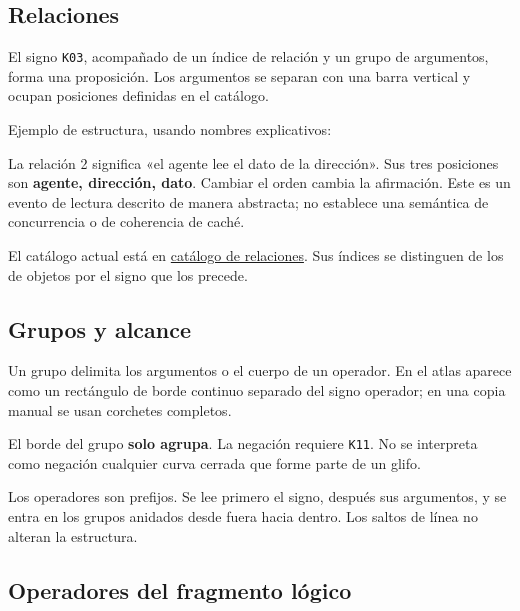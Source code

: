 \subsection{Relaciones}

El signo \texttt{K03}, acompañado de un índice de relación y un grupo de argumentos, forma una proposición. Los argumentos se separan con una barra vertical y ocupan posiciones definidas en el catálogo.

Ejemplo de estructura, usando nombres explicativos:


La relación 2 significa «el agente lee el dato de la dirección». Sus tres posiciones son \textbf{agente, dirección, dato}. Cambiar el orden cambia la afirmación. Este es un evento de lectura descrito de manera abstracta; no establece una semántica de concurrencia o de coherencia de caché.

El catálogo actual está en \hyperref[sec:relaciones]{catálogo de relaciones}. Sus índices se distinguen de los de objetos por el signo que los precede.

\subsection{Grupos y alcance}

Un grupo delimita los argumentos o el cuerpo de un operador. En el atlas aparece como un rectángulo de borde continuo separado del signo operador; en una copia manual se usan corchetes completos.

El borde del grupo \textbf{solo agrupa}. La negación requiere \texttt{K11}. No se interpreta como negación cualquier curva cerrada que forme parte de un glifo.

Los operadores son prefijos. Se lee primero el signo, después sus argumentos, y se entra en los grupos anidados desde fuera hacia dentro. Los saltos de línea no alteran la estructura.

\subsection{Operadores del fragmento lógico}

